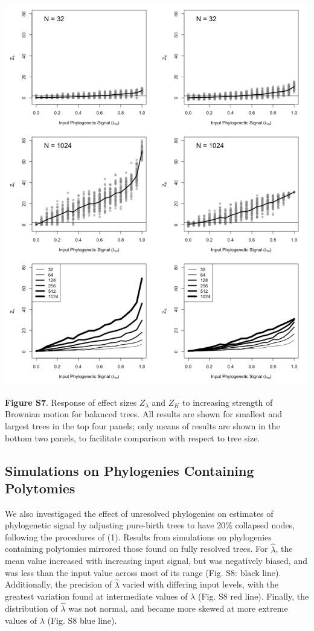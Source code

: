 \documentclass[
]{article}
\begin{document}
\includegraphics[width=0.95\linewidth]{fig.S7}

\textbf{Figure S7}. Response of effect sizes \(Z_{\lambda}\) and \(Z_K\)
to increasing strength of Brownian motion for balanced trees. All
results are shown for smallest and largest trees in the top four panels;
only means of results are shown in the bottom two panels, to facilitate
comparison with respect to tree size.

\newpage

\hypertarget{simulations-on-phylogenies-containing-polytomies}{%
\subsection{Simulations on Phylogenies Containing
Polytomies}\label{simulations-on-phylogenies-containing-polytomies}}

We also investigaged the effect of unresolved phylogenies on estimates
of phylogenetic signal by adjusting pure-birth trees to have 20\%
collapsed nodes, following the procedures of (1). Results from
simulations on phylogenies containing polytomies mirrored those found on
fully resolved trees. For \(\hat{\lambda}\), the mean value increased
with increasing input signal, but was negatively biased, and was less
than the input value across most of its range (Fig. S8: black line).
Additionally, the precision of \(\hat{\lambda}\) varied with differing
input levels, with the greatest variation found at intermediate values
of \(\lambda\) (Fig. S8 red line). Finally, the distribution of
\(\hat{\lambda}\) was not normal, and became more skewed at more extreme
values of \(\lambda\) (Fig. S8 blue line). \hfill\break
\end{document}
